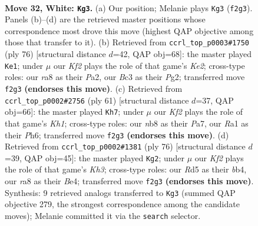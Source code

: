 \documentclass[11pt]{article}
\begin{document}
\clearpage

\begin{figure}[p]\centering
\begin{subfigure}{0.46\textwidth}\centering
\resizebox{\linewidth}{!}{%
\newchessgame
\chessboard[
  setfen={rn3k2/8/p7/3R1p2/1P3P2/2B5/P3bK1r/R7 w - - 5 32},
  showmover=false,
  pgfstyle=straightmove, color=movearrow, markmove={f2-g3}
]}
\caption{}
\end{subfigure}\hfill
\begin{subfigure}{0.46\textwidth}\centering
\resizebox{\linewidth}{!}{%
\newchessgame
\chessboard[
  setfen={8/6R1/3k4/1p5p/4rPb1/1B2p3/P3K1PP/8 w - - 1 39},
  showmover=false,
  pgfstyle=straightmove, color=movearrow, markmove={e2-e1}
]}
\caption{}
\end{subfigure}
\\[4pt]
\begin{subfigure}{0.46\textwidth}\centering
\resizebox{\linewidth}{!}{%
\newchessgame
\chessboard[
  setfen={5R1k/p7/6pp/3B4/1P1bP3/8/P6r/5K2 b - - 1 31},
  showmover=false,
  pgfstyle=straightmove, color=movearrow, markmove={h8-h7}
]}
\caption{}
\end{subfigure}\hfill
\begin{subfigure}{0.46\textwidth}\centering
\resizebox{\linewidth}{!}{%
\newchessgame
\chessboard[
  setfen={8/p6p/7r/p4R2/1b1kB3/5P1K/P4P2/8 w - - 3 39},
  showmover=false,
  pgfstyle=straightmove, color=movearrow, markmove={h3-g2}
]}
\caption{}
\end{subfigure}
\caption{\textbf{Move 32, White: \texttt{Kg3}.} (a) Our position; Melanie plays \texttt{Kg3} (\texttt{f2g3}). Panels (b)--(d) are the retrieved master positions whose correspondence most drove this move (highest QAP objective among those that transfer to it). (b) Retrieved from \texttt{ccrl\_top\_p0003\#1750} (ply 76) [structural distance $d$=42, QAP obj=68]: the master played \texttt{Ke1}; under $\mu$ our \emph{Kf2} plays the role of that game's \emph{Ke2}; cross-type roles: our \emph{r}a8 as their \emph{P}a2, our \emph{B}c3 as their \emph{P}g2; transferred move \texttt{f2g3} \textbf{(endorses this move)}. (c) Retrieved from \texttt{ccrl\_top\_p0002\#2756} (ply 61) [structural distance $d$=37, QAP obj=66]: the master played \texttt{Kh7}; under $\mu$ our \emph{Kf2} plays the role of that game's \emph{Kh1}; cross-type roles: our \emph{n}b8 as their \emph{P}a7, our \emph{R}a1 as their \emph{P}h6; transferred move \texttt{f2g3} \textbf{(endorses this move)}. (d) Retrieved from \texttt{ccrl\_top\_p0002\#1381} (ply 76) [structural distance $d$=39, QAP obj=45]: the master played \texttt{Kg2}; under $\mu$ our \emph{Kf2} plays the role of that game's \emph{Kh3}; cross-type roles: our \emph{R}d5 as their \emph{b}b4, our \emph{r}a8 as their \emph{B}e4; transferred move \texttt{f2g3} \textbf{(endorses this move)}. Synthesis: 9 retrieved analogs transferred to \texttt{Kg3} (summed QAP objective 279, the strongest correspondence among the candidate moves); Melanie committed it via the \texttt{search} selector.}
\label{fig:thought-m62}
\end{figure}
\end{document}
